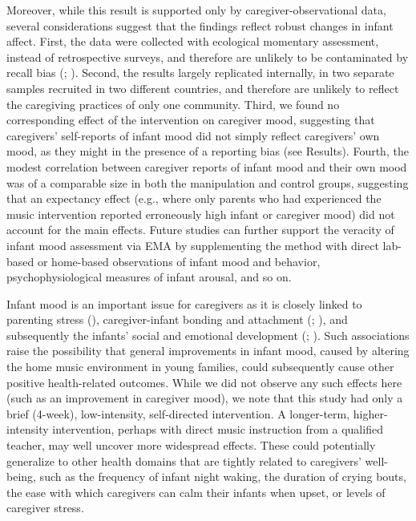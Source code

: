 \documentclass[
]{article}
\begin{document}
Moreover, while this result is supported only by caregiver-observational
data, several considerations suggest that the findings reflect robust
changes in infant affect. First, the data were collected with ecological
momentary assessment, instead of retrospective surveys, and therefore
are unlikely to be contaminated by recall bias
(;
). Second, the results largely
replicated internally, in two separate samples recruited in two
different countries, and therefore are unlikely to reflect the
caregiving practices of only one community. Third, we found no
corresponding effect of the intervention on caregiver mood, suggesting
that caregivers' self-reports of infant mood did not simply reflect
caregivers' own mood, as they might in the presence of a reporting bias
(see Results). Fourth, the modest correlation between caregiver reports
of infant mood and their own mood was of a comparable size in both the
manipulation and control groups, suggesting that an expectancy effect
(e.g., where only parents who had experienced the music intervention
reported erroneously high infant or caregiver mood) did not account for
the main effects. Future studies can further support the veracity of
infant mood assessment via EMA by supplementing the method with direct
lab-based or home-based observations of infant mood and behavior,
psychophysiological measures of infant arousal, and so on.

Infant mood is an important issue for caregivers as it is closely linked
to parenting stress (),
caregiver-infant bonding and attachment (; ), and
subsequently the infants' social and emotional development
(;
). Such associations raise
the possibility that general improvements in infant mood, caused by
altering the home music environment in young families, could
subsequently cause other positive health-related outcomes. While we did
not observe any such effects here (such as an improvement in caregiver
mood), we note that this study had only a brief (4-week), low-intensity,
self-directed intervention. A longer-term, higher-intensity
intervention, perhaps with direct music instruction from a qualified
teacher, may well uncover more widespread effects. These could
potentially generalize to other health domains that are tightly related
to caregivers' well-being, such as the frequency of infant night waking,
the duration of crying bouts, the ease with which caregivers can calm
their infants when upset, or levels of caregiver stress.
\end{document}

